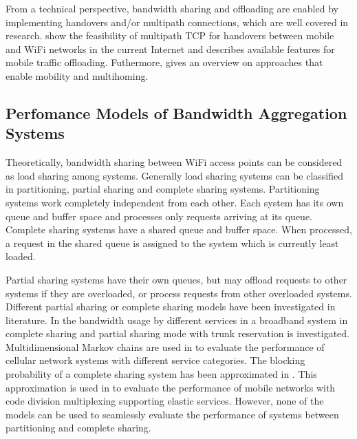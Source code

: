 From a technical perspective, bandwidth sharing and offloading are enabled by implementing handovers and/or multipath connections, which are well covered in research. \cite{gonzalez2013radio,paasch2012exploring,chen2013energy} show the feasibility of multipath TCP for handovers between mobile and WiFi networks in the current Internet and \cite{khadraoui2014survey} describes available features for mobile traffic offloading. Futhermore, \cite{gladisch2014survey} gives an overview on approaches that enable mobility and multihoming.

\subsection{Perfomance Models of Bandwidth Aggregation Systems}\label{sec:aggregation:background:aggr}

Theoretically, bandwidth sharing between WiFi access points can be considered as load sharing among systems.
Generally load sharing systems can be classified in partitioning, partial sharing and complete sharing systems.
Partitioning systems work completely independent from each other.
Each system has its own queue and buffer space and processes only requests arriving at its queue.
Complete sharing systems have a shared queue and buffer space. When processed, a request in the shared queue is assigned to the system which is currently least loaded.

Partial sharing systems have their own queues, but may offload requests to other systems if they are overloaded, or process requests from other overloaded systems.
Different partial sharing or complete sharing models have been investigated in literature.
In \cite{trangia1993trunk} the bandwidth usage by different services in a broadband system in complete sharing and partial sharing mode with trunk reservation is investigated.
Multidimensional Markov chains are used in \cite{chen2002performance,zhang2006dynamic,ke2010performance} to evaluate the performance of cellular network systems with different service categories.
The blocking probability of a complete sharing system has been approximated in \cite{kaufman1992blocking}.
This approximation is used in \cite{fodor2007bounding} to evaluate the performance of mobile networks with code division multiplexing supporting elastic services.
However, none of the models can be used to seamlessly evaluate the performance of systems between partitioning and complete sharing.


